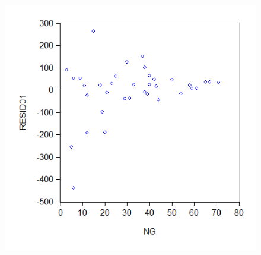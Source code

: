 \documentclass[12pt]{report}
\begin{document}
\begin{figure}[H]
	\centering
	\includegraphics{q1_6}
\end{figure}
\vspace{-\baselineskip}
\end{document}
